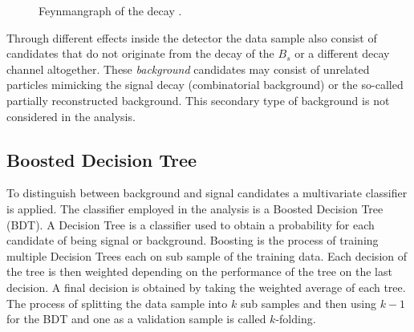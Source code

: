 \begin{figure}[htpb]
	\centering
	\def\widthscale {0.08\textwidth}
	\def\heightscale {0.04\textwidth}
	\usetikzlibrary{shapes.misc}
	\caption{Feynmangraph of the decay \signal.}
	\label{fig:feynman}
\end{figure}

Through different effects inside the detector the data sample also consist of candidates that do not originate from the decay of the $B_s$ or a different decay channel altogether. These \textit{background} candidates may consist of unrelated particles mimicking the signal decay (combinatorial background) or the so-called partially reconstructed background. This secondary type of background is not considered in the analysis. \\
\subsection{Boosted Decision Tree}
To distinguish between background and signal candidates a multivariate classifier is applied. The classifier employed in the analysis is a Boosted Decision Tree (BDT). A Decision Tree is a classifier used to obtain a probability for each candidate of being signal or background. Boosting is the process of training multiple Decision Trees each on sub sample of the training data. Each decision of the tree is then weighted depending on the performance of the tree on the last decision. A final decision is obtained by taking the weighted average of each tree. The process of splitting the data sample into $k$ sub samples and then using $k-1$ for the BDT and one as a validation sample is called $k$-folding.\\

